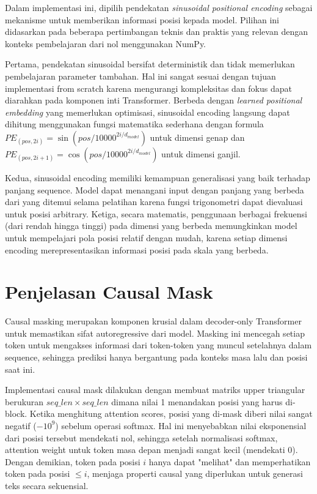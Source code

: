 \documentclass[11pt,a4paper]{article}
\begin{document}
Dalam implementasi ini, dipilih pendekatan \textit{sinusoidal positional encoding} sebagai mekanisme untuk memberikan informasi posisi kepada model. Pilihan ini didasarkan pada beberapa pertimbangan teknis dan praktis yang relevan dengan konteks pembelajaran dari nol menggunakan NumPy.

Pertama, pendekatan sinusoidal bersifat deterministik dan tidak memerlukan pembelajaran parameter tambahan. Hal ini sangat sesuai dengan tujuan implementasi from scratch karena mengurangi kompleksitas dan fokus dapat diarahkan pada komponen inti Transformer. Berbeda dengan \textit{learned positional embedding} yang memerlukan optimisasi, sinusoidal encoding langsung dapat dihitung menggunakan fungsi matematika sederhana dengan formula $PE_{(pos,2i)} = \sin(pos/10000^{2i/d_{model}})$ untuk dimensi genap dan $PE_{(pos,2i+1)} = \cos(pos/10000^{2i/d_{model}})$ untuk dimensi ganjil.

Kedua, sinusoidal encoding memiliki kemampuan generalisasi yang baik terhadap panjang sequence. Model dapat menangani input dengan panjang yang berbeda dari yang ditemui selama pelatihan karena fungsi trigonometri dapat dievaluasi untuk posisi arbitrary. Ketiga, secara matematis, penggunaan berbagai frekuensi (dari rendah hingga tinggi) pada dimensi yang berbeda memungkinkan model untuk mempelajari pola posisi relatif dengan mudah, karena setiap dimensi encoding merepresentasikan informasi posisi pada skala yang berbeda.

\section{Penjelasan Causal Mask}

Causal masking merupakan komponen krusial dalam decoder-only Transformer untuk memastikan sifat autoregressive dari model. Masking ini mencegah setiap token untuk mengakses informasi dari token-token yang muncul setelahnya dalam sequence, sehingga prediksi hanya bergantung pada konteks masa lalu dan posisi saat ini.

Implementasi causal mask dilakukan dengan membuat matriks upper triangular berukuran $seq\_len \times seq\_len$ dimana nilai 1 menandakan posisi yang harus di-block. Ketika menghitung attention scores, posisi yang di-mask diberi nilai sangat negatif ($-10^9$) sebelum operasi softmax. Hal ini menyebabkan nilai eksponensial dari posisi tersebut mendekati nol, sehingga setelah normalisasi softmax, attention weight untuk token masa depan menjadi sangat kecil (mendekati 0). Dengan demikian, token pada posisi $i$ hanya dapat "melihat" dan memperhatikan token pada posisi $\leq i$, menjaga properti causal yang diperlukan untuk generasi teks secara sekuensial.
\end{document}
